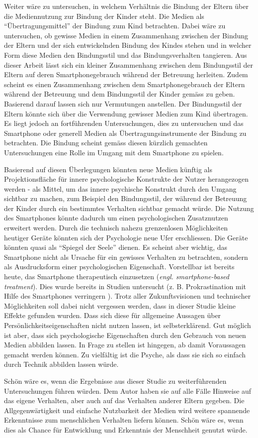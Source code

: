 Weiter wäre zu untersuchen, in welchem Verhältnis die Bindung der Eltern über die Mediennutzung zur Bindung der Kinder steht. Die Medien als \enquote{Übertragungsmittel} der Bindung zum Kind betrachten. Dabei wäre zu untersuchen, ob gewisse Medien in einem Zusammenhang zwischen der Bindung der Eltern und der sich entwickelnden Bindung des Kindes stehen und in welcher Form diese Medien den Bindungsstil und das Bindungsverhalten tangieren. Aus dieser Arbeit lässt sich ein kleiner Zusammenhang zwischen dem Bindungsstil der Eltern auf deren Smartphonegebrauch während der Betreuung herleiten. Zudem scheint es einen Zusammenhang zwischen dem Smartphonegebrauch der Eltern während der Betreuung und dem Bindungsstil der Kinder gemäss  zu geben. Basierend darauf lassen sich nur Vermutungen anstellen. Der Bindungsstil der Eltern könnte sich über die Verwendung gewisser Medien zum Kind übertragen. Es liegt jedoch an fortführenden Untersuchungen, dies zu untersuchen und das Smartphone oder generell Medien als Übertragungsinstrumente der Bindung zu betrachten. Die Bindung scheint gemäss diesen kürzlich gemachten Untersuchungen eine Rolle im Umgang mit dem Smartphone zu spielen.

Basierend auf diesen Überlegungen könnten neue Medien künftig als Projektionsfläche für innere psychologische Konstrukte der Nutzer herangezogen werden - als Mittel, um das innere psychische Konstrukt durch den Umgang sichtbar zu machen, zum Beispiel den Bindungsstil, der während der Betreuung der Kinder durch ein bestimmtes Verhalten sichtbar gemacht würde. Die Nutzung des Smartphones könnte dadurch um einen psychologischen Zusatznutzen erweitert werden. Durch die technisch nahezu grenzenlosen Möglichkeiten heutiger Geräte könnten sich der Psychologie neue Ufer erschliessen. Die Geräte könnten quasi als \enquote{Spiegel der Seele} dienen. Es scheint aber wichtig, das Smartphone nicht als Ursache für ein gewisses Verhalten zu betrachten, sondern als Ausdrucksform einer psychologischen Eigenschaft. Vorstellbar ist bereits heute, das Smartphone therapeutisch einzusetzen (\textit{engl. smartphone-based treatment}). Dies wurde bereits in Studien untersucht (z. B. Prokrastination mit Hilfe des Smartphones verringern \cite{Lukas2018}). Trotz aller Zukunftsvisionen und technischer Möglichkeiten soll dabei nicht vergessen werden, dass in dieser Studie kleine Effekte gefunden wurden. Dass sich diese für allgemeine Aussagen über Persönlichkeitseigenschaften nicht nutzen lassen, ist selbsterklärend. Gut möglich ist aber, dass sich psychologische Eigenschaften durch den Gebrauch von neuen Medien abbilden lassen. In Frage zu stellen ist hingegen, ab damit Voraussagen gemacht werden können. Zu vielfältig ist die Psyche, als dass sie sich so einfach durch Technik abbilden lassen würde.  

Schön wäre es, wenn die Ergebnisse aus dieser Studie zu weiterführenden Untersuchungen führen würden. Dem Autor haben sie auf alle Fälle Hinweise auf das eigene Verhalten, aber auch auf das Verhalten anderer Eltern gegeben. Die Allgegenwärtigkeit und einfache Nutzbarkeit der Medien wird weitere spannende Erkenntnisse zum menschlichen Verhalten liefern können. Schön wäre es, wenn dies als Chance für Entwicklung und Erkenntnis der Menschheit genutzt würde.

\newpage